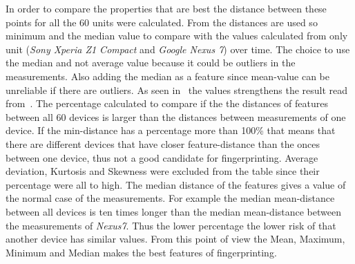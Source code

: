 In order to compare the properties that are best the distance between these points for all the 60 units were calculated. From the distances are used so minimum and the median value to compare with the values calculated from only unit (\textit{Sony Xperia Z1 Compact} and \textit{Google Nexus 7}) over time. The choice to use the median and not average value because it could be outliers in the measurements. Also adding the median as a feature since mean-value can be unreliable if there are outliers. As seen in~ the values strengthens the result read from~. The percentage calculated to compare if the the distances of features between all 60 devices is larger than the distances between measurements of one device. If the min-distance has a percentage more than 100\% that means that there are different devices that have closer feature-distance than the onces between one device, thus not a good candidate for fingerprinting. Average deviation, Kurtosis and Skewness were excluded from the table since their percentage were all to high. The median distance of the features gives a value of the normal case of the measurements. For example the median mean-distance between all devices is ten times longer than the median mean-distance between the measurements of \textit{Nexus7}. Thus the lower percentage the lower risk of that another device has similar values. From this point of view the Mean, Maximum, Minimum and Median makes the best features of fingerprinting.

